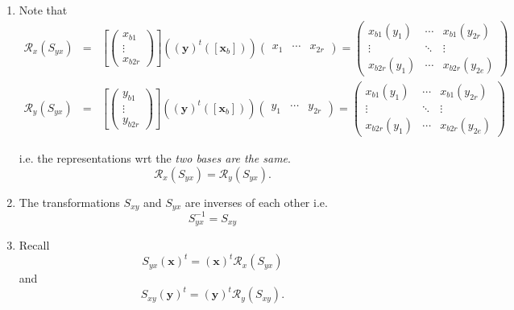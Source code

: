\documentclass[aps,preprint]{revtex4}
\begin{document}
\begin{enumerate}
\item Note that 
\begin{eqnarray}
\mathcal{R}_{x}\left( S_{yx}\right) &=&\left[ \left( 
\begin{array}{c}
x_{b1} \\ 
\vdots \\ 
x_{b2r}%
\end{array}%
\right) \right] \left( \overset{}{\left( \boldsymbol{y}\right) ^{t}\left( %
\left[ \boldsymbol{x}_{b}\right] \right) }\right) \left( 
\begin{array}{ccc}
x_{1} & \cdots & x_{2r}%
\end{array}%
\right) =\left( 
\begin{array}{ccc}
x_{b1}\left( y_{1}\right) & \cdots & x_{b1}\left( y_{2r}\right) \\ 
\vdots & \ddots & \vdots \\ 
x_{b2r}\left( y_{1}\right) & \cdots & x_{b2r}\left( y_{2e}\right)%
\end{array}%
\right) \\
\mathcal{R}_{y}\left( S_{yx}\right) &=&\left[ \left( 
\begin{array}{c}
y_{b1} \\ 
\vdots \\ 
y_{b2r}%
\end{array}%
\right) \right] \left( \overset{}{\left( \boldsymbol{y}\right) ^{t}\left( %
\left[ \boldsymbol{x}_{b}\right] \right) }\right) \left( 
\begin{array}{ccc}
y_{1} & \cdots & y_{2r}%
\end{array}%
\right) =\left( 
\begin{array}{ccc}
x_{b1}\left( y_{1}\right) & \cdots & x_{b1}\left( y_{2r}\right) \\ 
\vdots & \ddots & \vdots \\ 
x_{b2r}\left( y_{1}\right) & \cdots & x_{b2r}\left( y_{2e}\right)%
\end{array}%
\right)
\end{eqnarray}

i.e. the representations wrt the \emph{two bases are the same}. 
\begin{equation}
\mathcal{R}_{x}\left( S_{yx}\right) =\mathcal{R}_{y}\left( S_{yx}\right) .
\end{equation}

\item The transformations $S_{xy}$ and $S_{yx}$ are inverses of each other
i.e. 
\begin{equation}
S_{yx}^{-1}=S_{xy}
\end{equation}

\item Recall 
\begin{equation}
S_{yx}\left( \boldsymbol{x}\right) ^{t}=\left( \boldsymbol{x}\right) ^{t}%
\mathcal{R}_{x}\left( S_{yx}\right)
\end{equation}%
and 
\begin{equation}
S_{xy}\left( \boldsymbol{y}\right) ^{t}=\left( \boldsymbol{y}\right) ^{t}%
\mathcal{R}_{y}\left( S_{xy}\right) .
\end{equation}
\end{enumerate}
\end{document}
